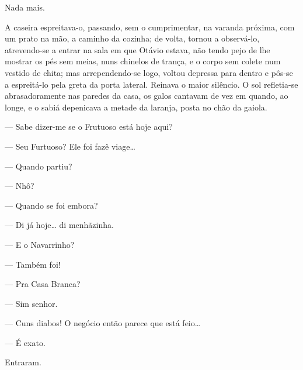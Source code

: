 {Nada mais.


A caseira espreitava-o, passando, sem o cumprimentar, na varanda
próxima, com um prato na mão, a caminho da cozinha; de volta, tornou a
observá-lo, atrevendo-se a entrar na sala em que Otávio
estava, não tendo pejo de lhe mostrar os pés sem meias, nuns chinelos de
trança, e o corpo sem colete num vestido de chita; mas arrependendo-se
logo, voltou depressa para dentro e pôs-se a
espreitá-lo pela greta da porta lateral. Reinava o maior
silêncio. O sol refletia-se abrasadoramente nas paredes da
casa, os galos cantavam de vez em quando, ao longe, e o sabiá depenicava
a metade da laranja, posta no chão da gaiola.


--- Sabe dizer-me se o Frutuoso está hoje aqui?

--- Seu Furtuoso? Ele foi fazê viage\ldots{}

--- Quando partiu?

--- Nhô?

--- Quando se foi embora?

--- Di já hoje\ldots{} di menhãzinha.




--- E o Navarrinho?

--- Também foi!

--- Pra Casa Branca?

--- Sim senhor.

--- Cuns diabos! O negócio então
parece que está feio\ldots{}

--- É exato.

Entraram.


}
